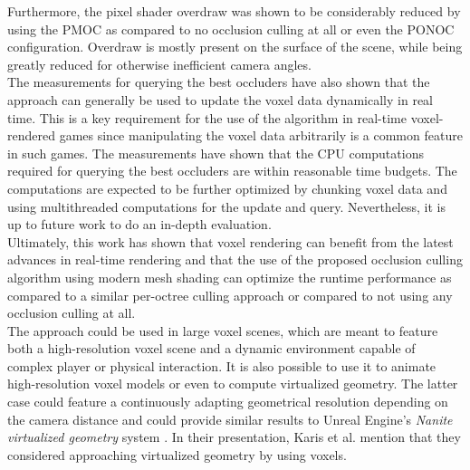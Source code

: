 \noindent
Furthermore, the pixel shader overdraw was shown to be considerably reduced by using 
the \ac{PMOC} as compared to no occlusion culling at all or even the \ac{PONOC} 
configuration. Overdraw is mostly present on the surface of the scene, while being 
greatly reduced for otherwise inefficient camera angles. \\

\noindent
The measurements for querying the best occluders have also shown that the approach can 
generally be used to update the voxel data dynamically in real time. This is a key 
requirement for the use of the algorithm in real-time voxel-rendered games since 
manipulating the voxel data arbitrarily is a common feature in such games. The 
measurements have shown that the \ac{CPU} computations required for querying the 
best occluders are within reasonable time budgets. The computations are expected to 
be further optimized by chunking voxel data and using multithreaded computations for 
the update and query. Nevertheless, it is up to future work to do an in-depth evaluation. \\

\noindent
Ultimately, this work has shown that voxel rendering can benefit from the latest advances 
in real-time rendering and that the use of the proposed occlusion culling algorithm 
using modern mesh shading can optimize the runtime performance as compared to a similar 
per-octree culling approach or compared to not using any occlusion culling at all. \\

\noindent
The approach could be used in large voxel scenes, which are meant to feature both a 
high-resolution voxel scene and a dynamic environment capable of complex player or 
physical interaction. It is also possible to use it to animate high-resolution voxel 
models or even to compute virtualized geometry. The latter case could feature a 
continuously adapting geometrical resolution depending on the camera distance and 
could provide similar results to Unreal Engine's \emph{Nanite virtualized geometry} 
system \cite{Karis2021}. In their presentation, Karis et al. mention that they 
considered approaching virtualized geometry by using voxels. 